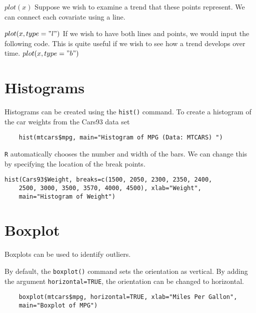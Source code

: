 \begin{frame}
$plot(x)$
Suppose we wish to examine a trend that these points represent. We can connect each covariate using a line.

$plot(x, type = "l")$
If we wish to have both lines and points, we would input the following code. This is quite useful if we wish to see how a trend develops over time.
$plot(x, type = "b")$











\section{Histograms}
Histograms can be created using the \texttt{hist()} command.
To create a histogram of the car weights from the Cars93 data set
\footnotesize
\begin{myindentpar}{1cm}
	\begin{verbatim}
	hist(mtcars$mpg, main="Histogram of MPG (Data: MTCARS) ")
	\end{verbatim}
\end{myindentpar}\normalsize
\texttt{R} automatically chooses the number and width of the bars. We can
change this by specifying the location of the break points.
\footnotesize
\begin{myindentpar}{1cm}
	\begin{verbatim}hist(Cars93$Weight, breaks=c(1500, 2050, 2300, 2350, 2400,
	2500, 3000, 3500, 3570, 4000, 4500), xlab="Weight",
	main="Histogram of Weight")
	\end{verbatim}
\end{myindentpar}\normalsize



\section{Boxplot}
Boxplots can be used to identify outliers.

By default, the \texttt{boxplot()} command sets the orientation as vertical. By adding the argument \texttt{horizontal=TRUE}, the orientation can be changed to horizontal.
\footnotesize
\begin{framed}
	\begin{verbatim}
	boxplot(mtcars$mpg, horizontal=TRUE, xlab="Miles Per Gallon",
	main="Boxplot of MPG")
	\end{verbatim}
\end{framed}


\end{frame}
